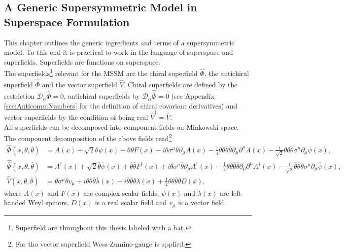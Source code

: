 \subsection{A Generic Supersymmetric Model in Superspace Formulation}
This chapter outlines the generic ingredients and terms of a supersymmetric model. To this end it is practical to work in the language of superspace and superfields. Superfields are functions on superspace.\\
The superfields\footnote{Superfield are throughout this thesis labeled with a hat.} relevant for the MSSM are the chiral superfield $\hat{\Phi}$, the antichiral superfield $\hat{\overline{\Phi}}$ and the vector superfield $\hat{V}$. Chiral superfields are defined by the restriction $\overline{\mathcal{D}}_{\dot{\alpha}}\hat{\Phi} = 0$, antichiral superfields by $\mathcal{D}_\alpha\hat{\overline{\Phi}} = 0$ (see Appendix \ref{sec:AnticommNumbers} for the definition of chiral covariant derivatives) and vector superfields by the condition of being real $\hat{V}^\dagger = \hat{V}$.\\
All superfields can be decomposed into component fields on Minkowski space. The component decomposition of the above fields read\footnote{For tho vector superfield Wess-Zumino-gauge is applied.}
\begin{align}
\hat{\Phi}(x,\theta,\overline{\theta}) &= A(x) + \sqrt{2}\theta\psi(x) + \theta\theta F(x) - i\theta\sigma^\mu \overline{\theta}\partial_\mu A(x) - \frac{1}{4}\theta\theta\overline{\theta}\overline{\theta}\partial_\mu\partial^\mu A(x) - \frac{i}{\sqrt{2}}\theta\theta\overline{\theta}\overline{\sigma}^\mu \partial_\mu\psi(x),\nonumber\\
\hat{\overline{\Phi}}(x,\theta,\overline{\theta}) &= A^\dagger(x) + \sqrt{2}\overline{\theta}\overline{\psi}(x) + \overline{\theta}\overline{\theta} F^\dagger(x) + i\theta\sigma^\mu \overline{\theta}\partial_\mu A^\dagger(x) - \frac{1}{4}\theta\theta\overline{\theta}\overline{\theta}\partial_\mu\partial^\mu A^\dagger(x) - \frac{i}{\sqrt{2}}\overline{\theta}\overline{\theta}\theta\sigma^\mu \partial_\mu\overline{\psi}(x),\nonumber\\
\hat{V}(x,\theta,\overline{\theta}) &= \theta\sigma^\mu\overline{\theta} v_\mu + i\theta\theta\overline{\theta}\overline{\lambda}(x) -i \overline{\theta}\overline{\theta}\theta\lambda(x) + \frac{1}{2}\theta\theta\overline{\theta}\overline{\theta}D(x),\label{eq:superfielddecomp}
\end{align}
where $A(x)$ and $F(x)$ are complex scalar fields, $\psi(x)$ and $\lambda(x)$ are left-handed Weyl spinors, $D(x)$ is a real scalar field and $v_\mu$ is a vector field.\\
